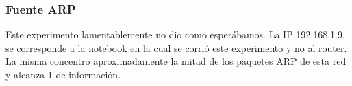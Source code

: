 \subsubsection{Fuente ARP}

\begin{figure}[hp!]
	\begin{minipage}[b]{0.9\linewidth}
	\end{minipage}
\end{figure}

Este experimento lamentablemente no dio como esperábamos. La IP 192.168.1.9, se corresponde
a la notebook en la cual se corrió este experimento y no al router. La misma concentro aproximadamente
la mitad de los paquetes ARP de esta red y alcanza 1 de información.


